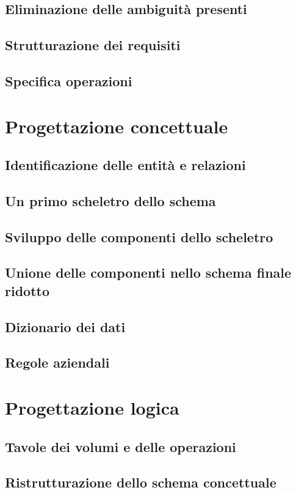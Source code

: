 \documentclass[11pt]{article}
\begin{document}
\subsection{Eliminazione delle ambiguità presenti}
\subsection{Strutturazione dei requisiti}
\subsection{Specifica operazioni}

\section{Progettazione concettuale}
\subsection{Identificazione delle entità e relazioni}
\subsection{Un primo scheletro dello schema}
\subsection{Sviluppo delle componenti dello scheletro}
\subsection{Unione delle componenti nello schema finale ridotto}
\subsection{Dizionario dei dati}
\subsection{Regole aziendali}

\section{Progettazione logica}
\subsection{Tavole dei volumi e delle operazioni}
\subsection{Ristrutturazione dello schema concettuale}
\end{document}
